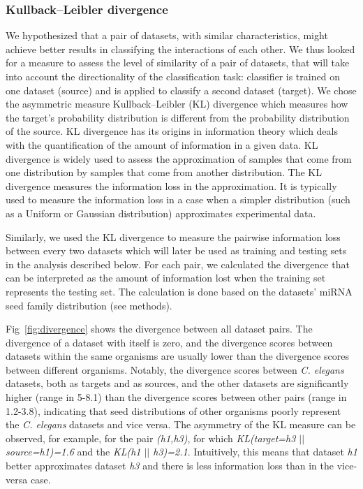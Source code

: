 \documentclass{bmcart}
\begin{document}
\subsubsection*{Kullback–Leibler divergence}
We hypothesized that a pair of datasets, with similar characteristics, might achieve better results in classifying the interactions of each other. We thus looked for a measure to assess the level of similarity of a pair of datasets, that will take into account the directionality of the classification task: classifier is trained on one dataset (source) and is applied to classify a second dataset (target).
We chose the asymmetric measure Kullback–Leibler (KL) divergence which measures how the target's probability distribution is different from the probability distribution of the source. KL divergence has its origins in information theory which deals with the quantification of the amount of information in a given data. KL divergence is widely used to assess the approximation of samples that come from one distribution by samples that come from another distribution. The KL divergence measures the information loss in the approximation. It is typically used to measure the information loss in a case when a simpler distribution (such as a Uniform or Gaussian distribution) approximates experimental data.

Similarly, we used the KL divergence to measure the pairwise information loss between every two datasets which will later be used as training and testing sets in the analysis described below. For each pair, we calculated the divergence that can be interpreted as the amount of information lost when the training set represents the testing set. The calculation is done based on the datasets' miRNA seed family distribution (see methods).

Fig~\ref{fig:divergence} shows the divergence between all dataset pairs. The divergence of a dataset with itself is zero, and the divergence scores between datasets within the same organisms are usually lower than the divergence scores between different organisms. Notably, the divergence scores between \textit{C. elegans} datasets, both as targets and as sources, and the other datasets are significantly higher (range in 5-8.1) than the divergence scores between other pairs (range in 1.2-3.8), indicating that seed distributions of other organisms poorly represent the \textit{C. elegans} datasets and vice versa. The asymmetry of the KL measure can be observed, for example, for the pair \textit{(h1,h3)}, for which \textit{KL(target=h3 $||$ source=h1)=1.6} and the  \textit{KL(h1 $||$ h3)=2.1}. Intuitively, this means that dataset \textit{h1} better approximates dataset \textit{h3} and there is less information loss than in the vice-versa case.
\end{document}
